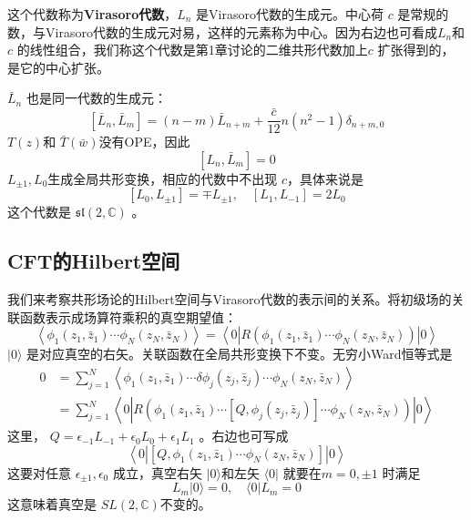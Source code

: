 这个代数称为\textbf{Virasoro代数}，$ L_n$ 是Virasoro代数的生成元。中心荷 $c$ 是常规的数，与Virasoro代数的生成元对易，这样的元素称为中心。因为右边也可看成$ L_n $和 $c$ 的线性组合，我们称这个代数是第1章讨论的二维共形代数加上$ c$ 扩张得到的，是它的中心扩张。

$\bar{L}_n$ 也是同一代数的生成元：
\begin{equation}	
\left[\bar{L}_{n}, \bar{L}_{m}\right]=(n-m) \bar{L}_{n+m}+\frac{\bar{c}}{12} n\left(n^{2}-1\right) \delta_{n+m, 0}
\end{equation}
$T(z) $和 $\bar{T}(\bar{w}) $没有OPE，因此
\begin{equation}
\left[L_{n}, \bar{L}_{m}\right]=0	
\end{equation}
$L_{\pm 1},L_0 $生成全局共形变换，相应的代数中不出现 $c $，具体来说是
\begin{equation}
\left[L_{0}, L_{\pm 1}\right]=\mp L_{\pm 1}, \quad\left[L_{1}, L_{-1}\right]=2 L_{0}
\end{equation}
这个代数是 $\mathfrak{sl}(2,\mathbb{C})$ 。

\subsection{CFT的Hilbert空间}
我们来考察共形场论的Hilbert空间与Virasoro代数的表示间的关系。将初级场的关联函数表示成场算符乘积的真空期望值：
\begin{equation}
	\left\langle\phi_{1}\left(z_{1}, \bar{z}_{1}\right) \cdots \phi_{N}\left(z_{N}, \bar{z}_{N}\right)\right\rangle=\left\langle 0\left|R\left(\phi_{1}\left(z_{1}, \bar{z}_{1}\right) \cdots \phi_{N}\left(z_{N}, \bar{z}_{N}\right)\right)\right| 0\right\rangle
\end{equation}
$|0\rangle$ 是对应真空的右矢。关联函数在全局共形变换下不变。无穷小Ward恒等式是
\begin{equation}
	\begin{aligned} 0 &=\sum_{j=1}^{N}\left\langle\phi_{1}\left(z_{1}, \bar{z}_{1}\right) \cdots \delta \phi_{j}\left(z_{j}, \bar{z}_{j}\right) \cdots \phi_{N}\left(z_{N}, \bar{z}_{N}\right)\right\rangle \\ &=\sum_{j=1}^{N}\left\langle 0\left|R\left(\phi_{1}\left(z_{1}, \bar{z}_{1}\right) \cdots\left[Q, \phi_{j}\left(z_{j}, \bar{z}_{j}\right)\right] \cdots \phi_{N}\left(z_{N}, \bar{z}_{N}\right)\right)\right| 0\right\rangle \end{aligned}
\end{equation}
这里， $Q=\epsilon_{-1} L_{-1}+\epsilon_{0} L_{0}+\epsilon_{1} L_{1}$ 。右边也可写成
\[
	\left\langle 0\left|\left[Q, \phi_{1}\left(z_{1}, \bar{z}_{1}\right) \cdots \phi_{N}\left(z_{N}, \bar{z}_{N}\right)\right]\right| 0\right\rangle
\]
这要对任意 $\epsilon_{\pm1},\epsilon_0$ 成立，真空右矢 $|0\rangle $和左矢 $\langle 0|$ 就要在$ m=0,\pm 1$ 时满足
\begin{equation}
	L_{m}|0\rangle=0, \quad\langle 0| L_{m}=0
\end{equation}
这意味着真空是 $SL(2,\mathbb{C}) $不变的。

